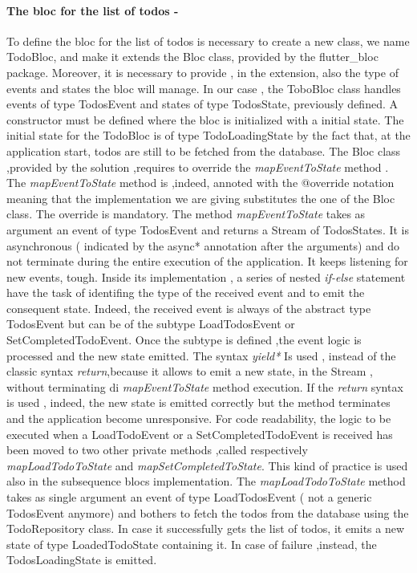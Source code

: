 \paragraph{The bloc for the list of todos - }
\label{subpar:todo_app_bloc_core_state}

To define the bloc for the list of todos is necessary to create a new class, we name TodoBloc, and make it extends the Bloc class, provided by the flutter\_bloc package. Moreover, it is necessary to provide , in the extension, also the type of events and states the bloc will manage. In our case , the ToboBloc class handles events of type TodosEvent and states of type TodosState, previously defined. A constructor must be defined where the bloc is initialized with a initial state. The initial state for the TodoBloc is of type TodoLoadingState by the fact that, at the application start, todos are still to be fetched from the database.
The Bloc class ,provided by the solution ,requires to override the \textit{mapEventToState} method . The \textit{mapEventToState} method is ,indeed, annoted with the @override notation meaning that the implementation we are giving substitutes the one of the Bloc class. The override is mandatory. The method \textit{mapEventToState} takes as argument an event of type TodosEvent and returns a Stream of TodosStates. It is asynchronous ( indicated by the async* annotation after the arguments) and do not terminate during the entire execution of the application. It keeps listening for new events, tough. Inside its implementation , a series of nested \textit{if-else }statement have the task of identifing the type of the received event and to emit the consequent state. Indeed, the received event is always of the abstract type TodosEvent but can be of the subtype LoadTodosEvent or SetCompletedTodoEvent. Once the subtype is defined ,the event logic is processed and the new state emitted.  The syntax \textit{yield*} Is used , instead of the classic syntax \textit{return},because it allows to emit a new state, in the Stream , without terminating di \textit{mapEventToState} method execution. If the \textit{return} syntax is used , indeed, the new state is emitted correctly but the method terminates and the application become unresponsive. For code readability, the logic to be executed when a LoadTodoEvent or a SetCompletedTodoEvent is received has been moved to two other private methods ,called respectively \textit{mapLoadTodoToState} and \textit{mapSetCompletedToState}. This kind of practice is used also in the subsequence blocs implementation. The \textit{mapLoadTodoToState} method takes as single argument an event of type LoadTodosEvent ( not a generic TodosEvent anymore) and bothers to fetch the todos from the database using the TodoRepository class. In case it successfully gets the list of todos, it emits a new state of type LoadedTodoState containing it. In case of failure ,instead, the TodosLoadingState is emitted.
